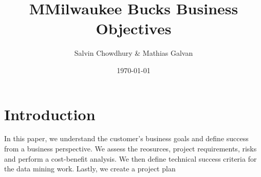 \documentclass[a4paper]{article}
\title{MMilwaukee Bucks Business Objectives}
\author{Salvin Chowdhury \& Mathias Galvan}
\date{\today}
\begin{document}
\maketitle

\newpage


\section{Introduction}
In this paper, we understand the customer's business goals and define success from a business perspective. We assess 
the reosurces, project requirements, risks and perform a cost-benefit analysis. We then define technical success 
criteria for the data mining work. Lastly, we create a project plan 
\end{document}
